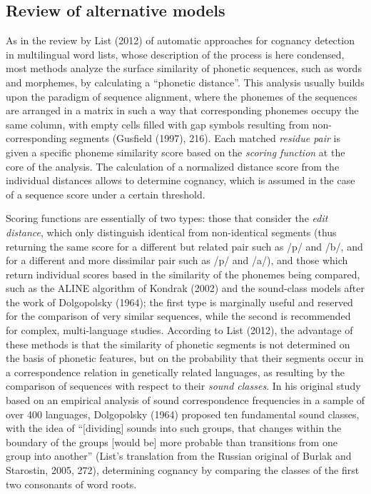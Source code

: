 \documentclass[a4paper]{article}
\begin{document}
\subsection{Review of alternative
models}\label{review-of-alternative-models}

As in the review by List (2012) of automatic approaches for cognancy
detection in multilingual word lists, whose description of the process
is here condensed, most methods analyze the surface similarity of
phonetic sequences, such as words and morphemes, by calculating a
``phonetic distance''. This analysis usually builds upon the paradigm of
sequence alignment, where the phonemes of the sequences are arranged in
a matrix in such a way that corresponding phonemes occupy the same
column, with empty cells filled with gap symbols resulting from
non-corresponding segments (Gusfield (1997), 216). Each matched
\emph{residue pair} is given a specific phoneme similarity score based
on the \emph{scoring function} at the core of the analysis. The
calculation of a normalized distance score from the individual distances
allows to determine cognancy, which is assumed in the case of a sequence
score under a certain threshold.

Scoring functions are essentially of two types: those that consider the
\emph{edit distance}, which only distinguish identical from
non-identical segments (thus returning the same score for a different
but related pair such as /p/ and /b/, and for a different and more
dissimilar pair such as /p/ and /a/), and those which return individual
scores based in the similarity of the phonemes being compared, such as
the ALINE algorithm of Kondrak (2002) and the sound-class models after
the work of Dolgopolsky (1964); the first type is marginally useful and
reserved for the comparison of very similar sequences, while the second
is recommended for complex, multi-language studies. According to List
(2012), the advantage of these methods is that the similarity of
phonetic segments is not determined on the basis of phonetic features,
but on the probability that their segments occur in a correspondence
relation in genetically related languages, as resulting by the
comparison of sequences with respect to their \emph{sound classes}. In
his original study based on an empirical analysis of sound
correspondence frequencies in a sample of over 400 languages,
Dolgopolsky (1964) proposed ten fundamental sound classes, with the idea
of ``{[}dividing{]} sounds into such groups, that changes within the
boundary of the groups {[}would be{]} more probable than transitions
from one group into another'' (List's translation from the Russian
original of Burlak and Starostin, 2005, 272), determining cognancy by
comparing the classes of the first two consonants of word roots.
\end{document}

